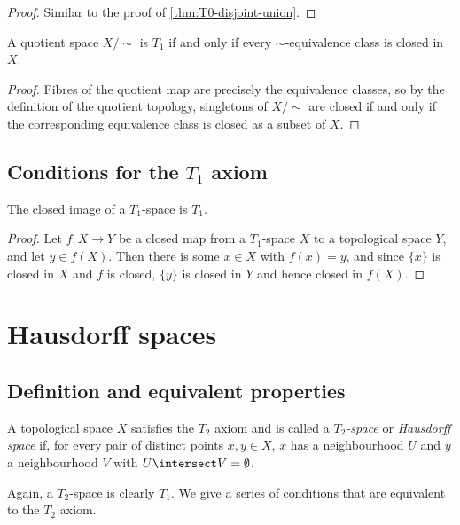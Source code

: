 \documentclass[article, a4paper, 11pt, oneside]{memoir}
\numberwithin{equation}{chapter}
\begin{document}
\begin{proof}
    Similar to the proof of \cref{thm:T0-disjoint-union}.
\end{proof}


\begin{proposition}
    A quotient space $X/{\sim}$ is $T_1$ if and only if every $\sim$-equivalence class is closed in $X$.
\end{proposition}

\begin{proof}
    Fibres of the quotient map are precisely the equivalence classes, so by the definition of the quotient topology, singletons of $X/{\sim}$ are closed if and only if the corresponding equivalence class is closed as a subset of $X$.
\end{proof}


\section[Conditions for the T1 axiom]{Conditions for the $T_1$ axiom}

\begin{proposition}
    The closed image\footnotemark{} of a $T_1$-space is $T_1$.
\end{proposition}

\begin{proof}%
    Let $f \colon X \to Y$ be a closed map from a $T_1$-space $X$ to a topological space $Y$, and let $y \in f(X)$. Then there is some $x \in X$ with $f(x) = y$, and since $\{x\}$ is closed in $X$ and $f$ is closed, $\{y\}$ is closed in $Y$ and hence closed in $f(X)$.
\end{proof}



\chapter{Hausdorff spaces}

\section{Definition and equivalent properties}

\begin{definition}
    A topological space $X$ satisfies the $T_2$ axiom and is called a \emph{$T_2$-space} or \emph{Hausdorff space} if, for every pair of distinct points $x,y \in X$, $x$ has a neighbourhood $U$ and $y$ a neighbourhood $V$ with $U \intersect V = \emptyset$.
\end{definition}
%
Again, a $T_2$-space is clearly $T_1$. We give a series of conditions that are equivalent to the $T_2$ axiom.
\end{document}
